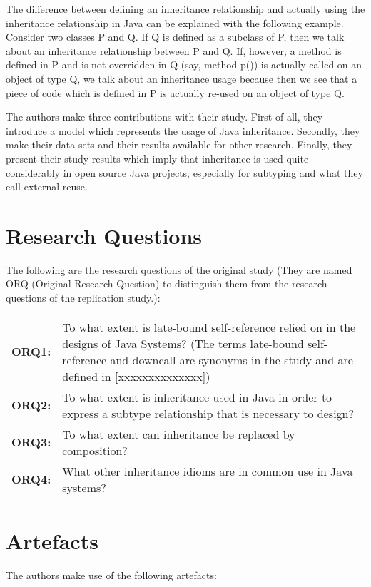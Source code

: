 \documentclass{uvamscse}
\begin{document}
The difference between defining an inheritance relationship and actually using the inheritance relationship in Java can be explained with the following example. Consider two classes P and Q. If Q is defined as a subclass of P, then we talk about an inheritance relationship between P and Q. If, however, a method is defined in P and is not overridden in Q (say, method p()) is actually called on an object of type Q, we talk about an inheritance usage because then we see that a piece of code which is defined in P is actually re-used on an object of type Q.

The authors make three contributions with their study. First of all, they introduce a model which represents the usage of Java inheritance. Secondly, they make their data sets and their results available for other research. Finally, they present their study results which imply that inheritance is used quite considerably in open source Java projects, especially for subtyping and what they call external reuse. 


\section{Research Questions} \label{OriginalRQuestions}

The following are the research questions of the original study (They are named ORQ (Original Research Question) to distinguish them from the research questions of the replication study.):


\begin{flushleft}
\begin{tabular}[t]{ p{20mm} p{110mm} }
  \bf{ORQ1:} &  To what extent is late-bound self-reference relied on in the designs of Java Systems? (The terms late-bound self-reference and downcall are synonyms in the study and are defined in [xxxxxxxxxxxxxx]) \\
  \bf{ORQ2:} &  To what extent is inheritance used in Java in order to express a subtype relationship that is necessary to design? \\
  \bf{ORQ3:} &  To what extent can inheritance be replaced by composition? \\
  \bf{ORQ4:} &  What other inheritance idioms are in common use in Java systems? \\
\end{tabular}
\end{flushleft}





\section{Artefacts}
The authors make use of the following artefacts:
\end{document}
